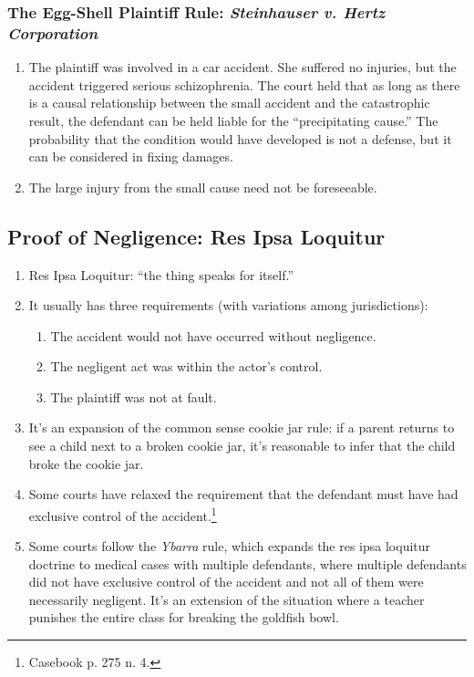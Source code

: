 \subsubsection{The Egg-Shell Plaintiff Rule: \emph{Steinhauser v. Hertz Corporation}}

\begin{enumerate}
    \item The plaintiff was involved in a car accident. She suffered no injuries, but the accident triggered serious schizophrenia. The court held that as long as there is a causal relationship between the small accident and the catastrophic result, the defendant can be held liable for the ``precipitating cause.'' The probability that the condition would have developed is not a defense, but it can be considered in fixing damages.
    \item The large injury from the small cause need not be foreseeable.
\end{enumerate}

\subsection{Proof of Negligence: Res Ipsa Loquitur}

\begin{enumerate}
    \item Res Ipsa Loquitur: ``the thing speaks for itself.''
    \item It usually has three requirements (with variations among jurisdictions):
    \begin{enumerate}
        \item The accident would not have occurred without negligence.
        \item The negligent act was within the actor's control.
        \item The plaintiff was not at fault.
    \end{enumerate}
    \item It's an expansion of the common sense cookie jar rule: if a parent returns to see a child next to a broken cookie jar, it's reasonable to infer that the child broke the cookie jar.
    \item Some courts have relaxed the requirement that the defendant must have had exclusive control of the accident.\footnote{Casebook p. 275 n. 4.}
    \item Some courts follow the \emph{Ybarra} rule, which expands the res ipsa loquitur doctrine to medical cases with multiple defendants, where multiple defendants did not have exclusive control of the accident and not all of them were necessarily negligent. It's an extension of the situation where a teacher punishes the entire class for breaking the goldfish bowl.
\end{enumerate}

